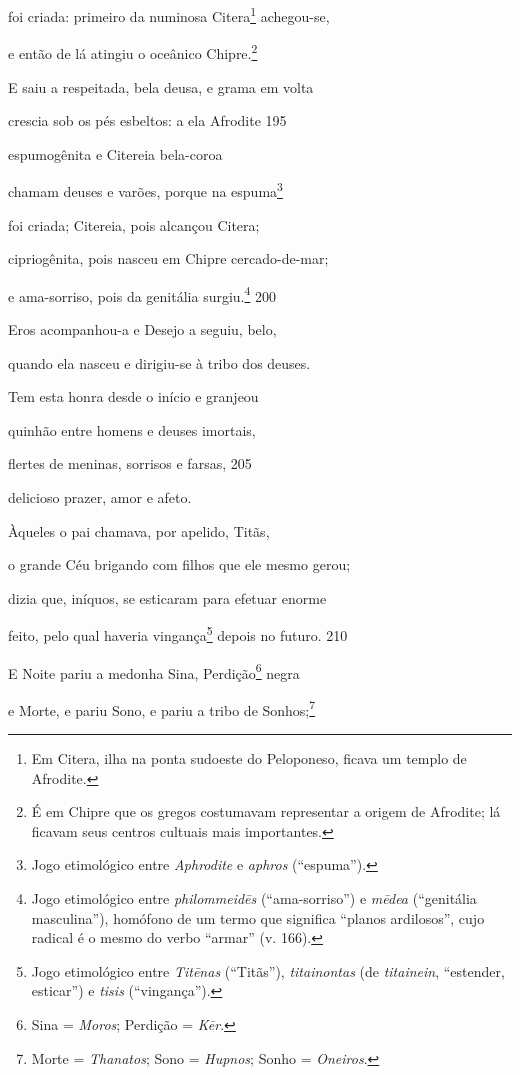foi criada: primeiro da numinosa Citera\footnote{Em Citera, ilha na ponta sudoeste do Peloponeso, ficava um templo de Afrodite. } achegou-se,

e então de lá atingiu o oceânico Chipre.\footnote{É em Chipre que os gregos costumavam representar a origem de Afrodite; lá ficavam seus centros cultuais mais importantes.}

E saiu a respeitada, bela deusa, e grama em volta

crescia sob os pés esbeltos: a ela Afrodite \num{195}

espumogênita e Citereia bela-coroa

chamam deuses e varões, porque na espuma\footnote{Jogo etimológico entre \emph{Aphrodite} e \emph{aphros} (``espuma'').}

foi criada; Citereia, pois alcançou Citera;

cipriogênita, pois nasceu em Chipre cercado-de-mar;

e ama-sorriso, pois da genitália surgiu.\footnote{Jogo etimológico entre \emph{philommeidēs} (``ama-sorriso'') e
\emph{mēdea} (``genitália masculina''), homófono de um termo que
significa ``planos ardilosos'', cujo radical é o mesmo do verbo
``armar'' (v. 166).} \num{200}

Eros acompanhou-a e Desejo a seguiu, belo,

quando ela nasceu e dirigiu-se à tribo dos deuses.

Tem esta honra desde o início e granjeou

quinhão entre homens e deuses imortais,

flertes de meninas, sorrisos e farsas, \num{205}

delicioso prazer, amor e afeto.

\quad{}Àqueles o pai chamava, por apelido, Titãs,

o grande Céu brigando com filhos que ele mesmo gerou;

dizia que, iníquos, se esticaram para efetuar enorme

feito, pelo qual haveria vingança\footnote{Jogo etimológico entre \emph{Titēnas} (``Titãs''),
\emph{titainontas} (de \emph{titainein}, ``estender, esticar'') e
\emph{tisis} (``vingança'').} depois no futuro. \num{210}

\quad{}E Noite pariu a medonha Sina, Perdição\footnote{Sina = \emph{Moros}; Perdição = \emph{Kēr}.} negra

e Morte, e pariu Sono, e pariu a tribo de Sonhos;\footnote{Morte = \emph{Thanatos}; Sono = \emph{Hupnos}; Sonho = \emph{Oneiros}.}

